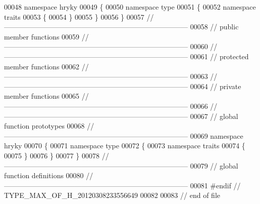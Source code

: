 \begin{DoxyCode}
00048 \textcolor{keyword}{namespace }hryky
00049 \{
00050 \textcolor{keyword}{namespace }type
00051 \{
00052 \textcolor{keyword}{namespace }traits
00053 \{
00054 \}
00055 \}
00056 \}
00057 \textcolor{comment}{//
      ------------------------------------------------------------------------------}
00058 \textcolor{comment}{// public member functions}
00059 \textcolor{comment}{//
      ------------------------------------------------------------------------------}
00060 \textcolor{comment}{//
      ------------------------------------------------------------------------------}
00061 \textcolor{comment}{// protected member functions}
00062 \textcolor{comment}{//
      ------------------------------------------------------------------------------}
00063 \textcolor{comment}{//
      ------------------------------------------------------------------------------}
00064 \textcolor{comment}{// private member functions}
00065 \textcolor{comment}{//
      ------------------------------------------------------------------------------}
00066 \textcolor{comment}{//
      ------------------------------------------------------------------------------}
00067 \textcolor{comment}{// global function prototypes}
00068 \textcolor{comment}{//
      ------------------------------------------------------------------------------}
00069 \textcolor{keyword}{namespace }hryky
00070 \{
00071 \textcolor{keyword}{namespace }type
00072 \{
00073 \textcolor{keyword}{namespace }traits
00074 \{
00075 \}
00076 \}
00077 \}
00078 \textcolor{comment}{//
      ------------------------------------------------------------------------------}
00079 \textcolor{comment}{// global function definitions}
00080 \textcolor{comment}{//
      ------------------------------------------------------------------------------}
00081 \textcolor{preprocessor}{#endif // TYPE\_MAX\_OF\_H\_20120308233556649}
00082 \textcolor{preprocessor}{}
00083 \textcolor{comment}{// end of file}
\end{DoxyCode}
